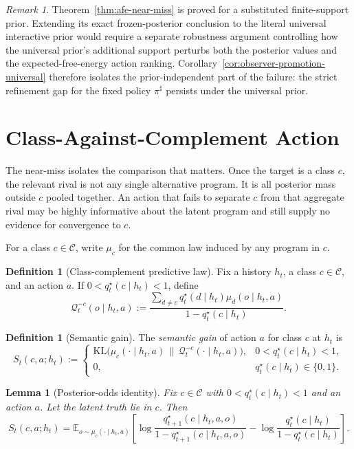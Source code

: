 \documentclass[11pt]{article}
\newtheorem{lemma}[theorem]{Lemma}
\theoremstyle{definition}
\newtheorem{definition}[theorem]{Definition}
\theoremstyle{remark}
\newtheorem{remark}[theorem]{Remark}
\newcommand{\Ccal}{\mathcal{C}}
\newcommand{\Qcal}{\mathcal{Q}}
\newcommand{\E}{\mathbb{E}}
\newcommand{\KL}{\mathrm{KL}}
\begin{document}
\begin{remark}
\label{rem:near-miss-universal}
Theorem~\ref{thm:afe-near-miss} is proved for a substituted finite-support prior. Extending its exact frozen-posterior conclusion to the literal universal interactive prior would require a separate robustness argument controlling how the universal prior's additional support perturbs both the posterior values and the expected-free-energy action ranking. Corollary~\ref{cor:observer-promotion-universal} therefore isolates the prior-independent part of the failure: the strict refinement gap for the fixed policy $\pi^\sharp$ persists under the universal prior.
\end{remark}

\section{Class-Against-Complement Action}
\label{sec:semantic-action}

The near-miss isolates the comparison that matters. Once the target is a class $c$, the relevant rival is not any single alternative program. It is all posterior mass outside $c$ pooled together. An action that fails to separate $c$ from that aggregate rival may be highly informative about the latent program and still supply no evidence for convergence to $c$.

For a class $c\in\Ccal$, write $\mu_c$ for the common law induced by any program in $c$.

\begin{definition}[Class-complement predictive law]
\label{def:class-complement}
Fix a history $h_t$, a class $c\in\Ccal$, and an action $a$. If $0<q_t^\star(c\mid h_t)<1$, define
\[
\Qcal_t^{-c}(o\mid h_t,a)
:=
\frac{\sum_{d\neq c} q_t^\star(d\mid h_t)\mu_d(o\mid h_t,a)}
{1-q_t^\star(c\mid h_t)}.
\]
\end{definition}

\begin{definition}[Semantic gain]
\label{def:semantic-gain}
The \emph{semantic gain} of action $a$ for class $c$ at $h_t$ is
\[
S_t(c,a;h_t)
:=
\begin{cases}
\KL\!\bigl(\mu_c(\cdot\mid h_t,a)\,\|\,\Qcal_t^{-c}(\cdot\mid h_t,a)\bigr), & 0<q_t^\star(c\mid h_t)<1,\\
0, & q_t^\star(c\mid h_t)\in\{0,1\}.
\end{cases}
\]
\end{definition}

\begin{lemma}[Posterior-odds identity]
\label{lem:odds-identity}
Fix $c\in\Ccal$ with $0<q_t^\star(c\mid h_t)<1$ and an action $a$. Let the latent truth lie in $c$. Then
\[
S_t(c,a;h_t)
=
\E_{o\sim\mu_c(\cdot\mid h_t,a)}\!\left[
\log\frac{q_{t+1}^\star(c\mid h_t,a,o)}{1-q_{t+1}^\star(c\mid h_t,a,o)}
-\log\frac{q_t^\star(c\mid h_t)}{1-q_t^\star(c\mid h_t)}
\right].
\]
\end{lemma}
\end{document}
